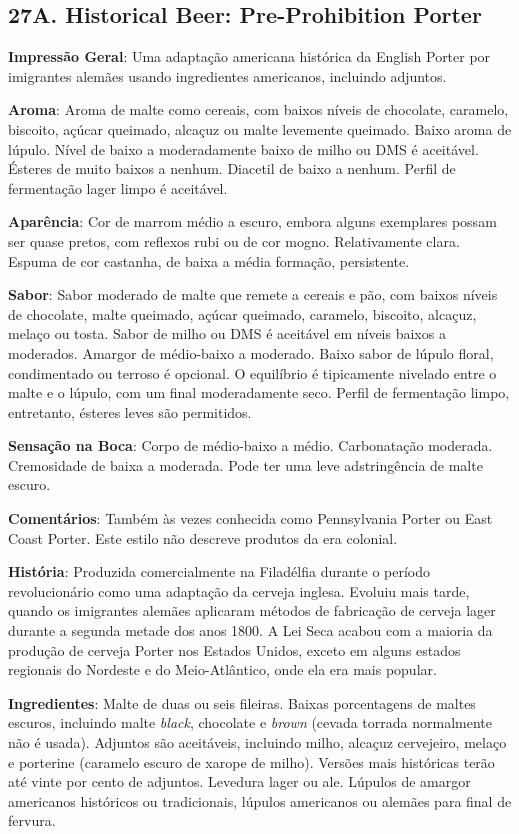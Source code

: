 \subsection*{27A. Historical Beer: Pre-Prohibition Porter}
\textbf{Impressão Geral}: Uma adaptação americana histórica da English Porter por imigrantes alemães usando ingredientes americanos, incluindo adjuntos.

\textbf{Aroma}: Aroma de malte como cereais, com baixos níveis de chocolate, caramelo, biscoito, açúcar queimado, alcaçuz ou malte levemente queimado. Baixo aroma de lúpulo. Nível de baixo a moderadamente baixo de milho ou DMS é aceitável. Ésteres de muito baixos a nenhum. Diacetil de baixo a nenhum. Perfil de fermentação lager limpo é aceitável.

\textbf{Aparência}: Cor de marrom médio a escuro, embora alguns exemplares possam ser quase pretos, com reflexos rubi ou de cor mogno. Relativamente clara. Espuma de cor castanha, de baixa a média formação, persistente.

\textbf{Sabor}: Sabor moderado de malte que remete a cereais e pão, com baixos níveis de chocolate, malte queimado, açúcar queimado, caramelo, biscoito, alcaçuz, melaço ou tosta. Sabor de milho ou DMS é aceitável em níveis baixos a moderados. Amargor de médio-baixo a moderado. Baixo sabor de lúpulo floral, condimentado ou terroso é opcional. O equilíbrio é tipicamente nivelado entre o malte e o lúpulo, com um final moderadamente seco. Perfil de fermentação limpo, entretanto, ésteres leves são permitidos.

\textbf{Sensação na Boca}: Corpo de médio-baixo a médio. Carbonatação moderada. Cremosidade de baixa a moderada. Pode ter uma leve adstringência de malte escuro.

\textbf{Comentários}: Também às vezes conhecida como Pennsylvania Porter ou East Coast Porter. Este estilo não descreve produtos da era colonial.

\textbf{História}: Produzida comercialmente na Filadélfia durante o período revolucionário como uma adaptação da cerveja inglesa. Evoluiu mais tarde, quando os imigrantes alemães aplicaram métodos de fabricação de cerveja lager durante a segunda metade dos anos 1800. A Lei Seca acabou com a maioria da produção de cerveja Porter nos Estados Unidos, exceto em alguns estados regionais do Nordeste e do Meio-Atlântico, onde ela era mais popular.

\textbf{Ingredientes}: Malte de duas ou seis fileiras. Baixas porcentagens de maltes escuros, incluindo malte \textit{black}, chocolate e \textit{brown} (cevada torrada normalmente não é usada). Adjuntos são aceitáveis, incluindo milho, alcaçuz cervejeiro, melaço e porterine (caramelo escuro de xarope de milho). Versões mais históricas terão até vinte por cento de adjuntos. Levedura lager ou ale. Lúpulos de amargor americanos históricos ou tradicionais, lúpulos americanos ou alemães para final de fervura.


